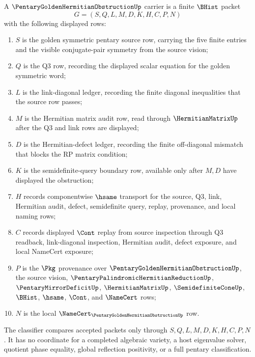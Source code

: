 \begin{definition}
\label{def:pentary-golden-hermitian-obstruction-carrier}
A $\PentaryGoldenHermitianObstructionUp$ carrier is a finite $\BHist$ packet
$$
G=(S,Q,L,M,D,K,H,C,P,N)
$$
with the following displayed rows:
\begin{enumerate}
\item $S$ is the golden symmetric pentary source row, carrying the five finite entries and the visible conjugate-pair symmetry from the source vision;
\item $Q$ is the Q3 row, recording the displayed scalar equation for the golden symmetric word;
\item $L$ is the link-diagonal ledger, recording the finite diagonal inequalities that the source row passes;
\item $M$ is the Hermitian matrix audit row, read through $\HermitianMatrixUp$ after the Q3 and link rows are displayed;
\item $D$ is the Hermitian-defect ledger, recording the finite off-diagonal mismatch that blocks the RP matrix condition;
\item $K$ is the semidefinite-query boundary row, available only after $M,D$ have displayed the obstruction;
\item $H$ records componentwise $\hsame$ transport for the source, Q3, link, Hermitian audit, defect, semidefinite query, replay, provenance, and local naming rows;
\item $C$ records displayed $\Cont$ replay from source inspection through Q3 readback, link-diagonal inspection, Hermitian audit, defect exposure, and local NameCert exposure;
\item $P$ is the $\Pkg$ provenance over $\PentaryGoldenHermitianObstructionUp$, the source vision, $\PentaryPalindromicHermitianReductionUp$, $\PentaryMirrorDeficitUp$, $\HermitianMatrixUp$, $\SemidefiniteConeUp$, $\BHist$, $\hsame$, $\Cont$, and $\NameCert$ rows;
\item $N$ is the local $\NameCert_{\PentaryGoldenHermitianObstructionUp}$ row.
\end{enumerate}
The classifier compares accepted packets only through $S,Q,L,M,D,K,H,C,P,N$. It has no coordinate for a completed algebraic variety, a host eigenvalue solver, quotient phase equality, global reflection positivity, or a full pentary classification.
\end{definition}

